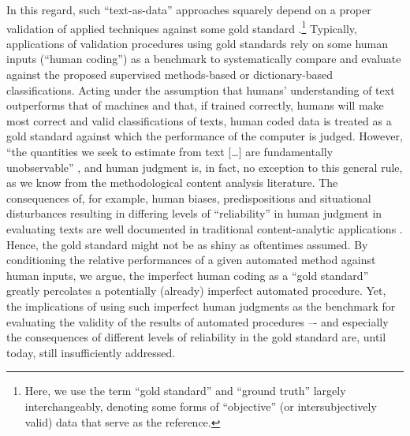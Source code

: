 \documentclass[man, floatsintext, 12pt, a4paper, noextraspace]{apa6}
\begin{document}
    In this regard, such \enquote{text-as-data} approaches squarely depend on a proper validation of applied techniques against some gold standard \parencite{grimmer2013text}.\footnote{ Here, we use the term \enquote{gold standard} and \enquote{ground truth} largely interchangeably, denoting some forms of \enquote{objective} (or intersubjectively valid) data that serve as the reference.} Typically, applications of validation procedures using gold standards rely on some human inputs (\enquote{human coding}) as a benchmark to systematically compare and evaluate against the proposed supervised methods-based or dictionary-based classifications. Acting under the assumption that humans’ understanding of text outperforms that of machines and that, if trained correctly, humans will make most correct and valid classifications of texts, human coded data is treated as a gold standard against which the performance of the computer is judged. However, “the quantities we seek to estimate from text [\ldots] are fundamentally unobservable” \parencite[p. 299]{lowe2013validating}, and human judgment is, in fact, no exception to this general rule, as we know from the methodological content analysis literature. The consequences of, for example, human biases, predispositions and situational disturbances resulting in differing levels of “reliability” in human judgment in evaluating texts are well documented in traditional content-analytic applications \parencite[e.g.,][]{krippendorff2004reliability, hayes2007answering, lombard2002content, ennser2018impact}. Hence, the gold standard might not be as shiny as oftentimes assumed. By conditioning the relative performances of a given automated method against human inputs, we argue, the imperfect human coding as a “gold standard” greatly percolates a potentially (already) imperfect automated procedure. Yet, the implications of using such imperfect human judgments as the benchmark for evaluating the validity of the results of automated procedures –- and especially the consequences of different levels of reliability in the gold standard are, until today, still insufficiently addressed. 
    
\end{document}
